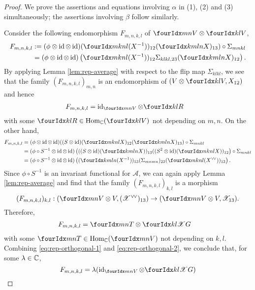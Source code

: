 \begin{proof}
  We prove the assertions and equations involving $\alpha$ in (1), (2)
  and (3)  simultaneously; the assertions involving $\beta$  follow similarly.

  Consider
  the following endomorphism $F_{m,n,k,l}$ of $\Gru{V}{m}{n}\otimes \Gru{V}{k}{l}$, 
  \begin{align*}
    F_{m,n,k,l}
    &:=(\phi \otimes \id \otimes \id)(\Gr{(X^{-1})}{m}{n}{k}{l})_{12}(\Gr{X}{k}{l}{m}{n})_{13})
    \circ \Sigma_{mnkl} \\ &= (\phi \otimes \id \otimes
    \id)\left(\Gr{(X^{-1})}{m}{n}{k}{l})_{12}
      \Sigma_{klkl,23}(\Gr{X}{k}{l}{m}{n})_{12}\right).
  \end{align*}
  By applying Lemma \ref{lem:rep-average} with respect to the flip map $\Sigma_{klkl}$, we see that the family $(F_{m,n,k,l})_{m,n}$ is
  an endomorphism of $(V \otimes \Gru{V}{k}{l}, X_{12})$ and hence
  \begin{align}
    F_{m,n,k,l} &= \id_{\Gru{V}{m}{n}} \otimes \Gru{R}{k}{l} \label{eq:rep-orthogonal-1}
  \end{align}
  with some $\Gru{R}{k}{l} \in \Hom_{\C}(\Gru{V}{k}{l})$ not
  depending on $m,n$. %
  On the other hand, 
  \begin{align*}
    F_{m,n,k,l} &= (\phi \otimes \id \otimes \id)((S \otimes
    \id)(\Gr{X}{m}{n}{k}{l})_{12}(\Gr{X}{k}{l}{m}{n})_{13})
    \circ \Sigma_{mnkl} \\
    &= (\phi\circ S^{-1} \otimes \id \otimes \id)\left(((S \otimes
      \id)(\Gr{X}{k}{l}{m}{n}))_{13}
      ((S^{2} \otimes \id)(\Gr{X}{m}{n}{k}{l}))_{12}\right)     \circ \Sigma_{mnkl}\\
    &= (\phi\circ S^{-1} \otimes \id \otimes
    \id)\left((\Gr{(X^{-1})}{k}{l}{m}{n})_{13} (\Sigma_{mnmn})_{23}
      (\Gr{(\dual{\dual{X}{}\!})}{m}{n}{k}{l})_{13}\right).
  \end{align*}
  Since $\phi\circ S^{-1}$ is an invariant functional for
  $\mathscr{A}$, we can again apply Lemma \ref{lem:rep-average} and
  find that the family $(F_{m,n,k,l})_{k,l}$ is a morphism \[(F_{m,n,k,l})_{k,l}:
  (\Gru{V}{m}{n} \otimes V, (\dual{\dual{\mathscr{X}}{}\!})_{13})\rightarrow (\Gru{V}{m}{n} \otimes V,
 \mathscr{X}_{13}).\] Therefore,
  \begin{align}
    F_{m,n,k,l} &= \Gru{T}{m}{n} \otimes \Gr{G}{k}{l}{}{\mathscr{X}} \label{eq:rep-orthogonal-2}
  \end{align}
  with some $\Gru{T}{m}{n} \in \mathcal{\Hom_{\C}}(\Gru{V}{m}{n})$
  not depending on $k,l$. Combining \eqref{eq:rep-orthogonal-1} and
  \eqref{eq:rep-orthogonal-2}, we conclude that, for some $\lambda\in \mathbb{C}$, \[F_{m,n,k,l} = \lambda
  (\id_{\Gru{V}{m}{n}} \otimes \Gr{G}{k}{l}{}{\mathscr{X}})\]
  

\end{proof}

